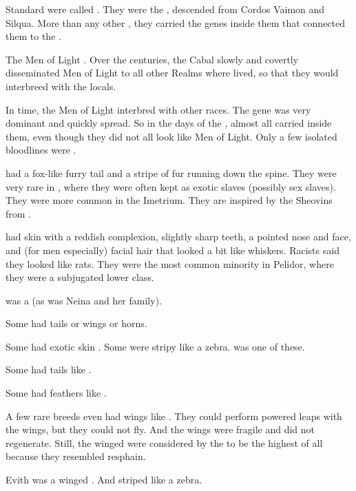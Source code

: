 \begin{gloss}
    
    Standard \humans were called \quo{\truehumans}. 
    They were the , descended from Cordos Vaimon and Silqua. 
    More than any other \humans, they carried the genes inside them that connected them to the  \matrix.
    
    The Men of Light .
    Over the centuries, the Cabal slowly and covertly disseminated Men of Light to all other Realms where \humans lived, so that they would interbreed with the locals. 
    
    In time, the Men of Light interbred with other \demihuman races. 
    The \Lithrim gene was very dominant and quickly spread. 
    So in the days of the \thirdbanewar, almost all \humans carried \Lithrim inside them, even though they did not all look like Men of Light. 
    Only a few isolated \human bloodlines were . 
    
  \gitem[\sheomir]{\sheomir}
    \Sheomir had a fox-like furry tail and a stripe of fur running down the spine. 
    They were very rare in \Velcad, where they were often kept as exotic slaves (possibly sex slaves). 
    They were more common in the Imetrium.
    They are inspired by the Sheovins from \cite{NykiBlatchley:KaydanaandtheStaffofIshlun}. 

  \gitem{\tulan}
    \Tulans had skin with a reddish complexion, slightly sharp teeth, a pointed nose and face, and (for men especially) facial hair that looked a bit like whiskers. 
    Racists said they looked like rats. 
    They were the most common minority in Pelidor, where they were a subjugated lower class. 
    
     was a \tulan (as was Neina and her family).
 
    Some had tails or wings or horns. 
    
    Some had exotic skin \colours. 
    Some were stripy like a zebra. 
     was one of these. 

    Some \demihumans had tails like \nephilim.
    
    Some had feathers like \resphain.
    
    A few rare breeds even had wings like \resphain. 
    They could perform powered leaps with the wings, but they could not fly. 
    And the wings were fragile and did not regenerate. 
    Still, the winged \humans were considered by the \resphain to be the highest of all \humans because they resembled resphain. 
    
    Evith was a winged \demihuman. 
    And striped like a zebra. 
\end{gloss}




